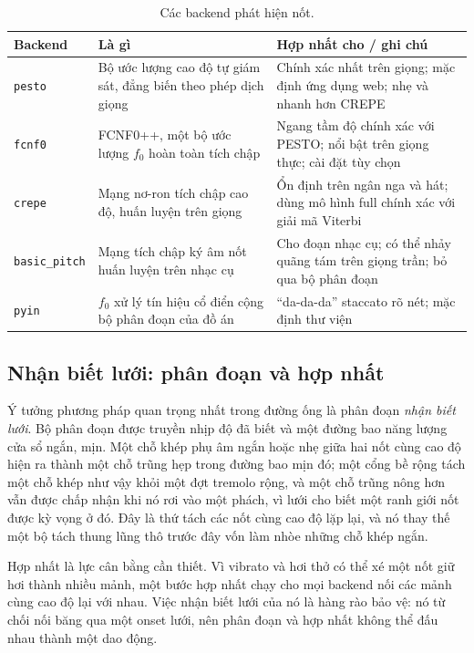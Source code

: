 \documentclass[12pt,a4paper]{article}
\begin{document}
\begin{table}[H]
\centering
\caption{Các backend phát hiện nốt.}
\label{tab:backends}
\begin{tabular}{l p{} p{}}
\toprule
\textbf{Backend} & \textbf{Là gì} & \textbf{Hợp nhất cho / ghi chú} \\
\midrule
\texttt{pesto} & Bộ ước lượng cao độ tự giám sát, đẳng biến theo phép dịch giọng &
Chính xác nhất trên giọng; mặc định ứng dụng web; nhẹ và nhanh hơn CREPE \\
\texttt{fcnf0} & FCNF0++, một bộ ước lượng $f_0$ hoàn toàn tích chập & Ngang tầm độ
chính xác với PESTO; nổi bật trên giọng thực; cài đặt tùy chọn \\
\texttt{crepe} & Mạng nơ-ron tích chập cao độ, huấn luyện trên giọng & Ổn định trên
ngân nga và hát; dùng mô hình full chính xác với giải mã Viterbi \\
\texttt{basic\_pitch} & Mạng tích chập ký âm nốt huấn luyện trên nhạc cụ & Cho đoạn
nhạc cụ; có thể nhảy quãng tám trên giọng trần; bỏ qua bộ phân đoạn \\
\texttt{pyin} & $f_0$ xử lý tín hiệu cổ điển cộng bộ phân đoạn của đồ án & ``da-da-da''
staccato rõ nét; mặc định thư viện \\
\bottomrule
\end{tabular}
\end{table}

\subsection{Nhận biết lưới: phân đoạn và hợp nhất}

Ý tưởng phương pháp quan trọng nhất trong đường ống là phân đoạn \emph{nhận biết
lưới}. Bộ phân đoạn được truyền nhịp độ đã biết và một đường bao năng lượng cửa sổ
ngắn, mịn. Một chỗ khép phụ âm ngắn hoặc nhẹ giữa hai nốt cùng cao độ hiện ra thành
một chỗ trũng hẹp trong đường bao mịn đó; một cổng bề rộng tách một chỗ khép như
vậy khỏi một đợt tremolo rộng, và một chỗ trũng nông hơn vẫn được chấp nhận khi nó
rơi vào một phách, vì lưới cho biết một ranh giới nốt được kỳ vọng ở đó. Đây là thứ
tách các nốt cùng cao độ lặp lại, và nó thay thế một bộ tách thung lũng thô trước
đây vốn làm nhòe những chỗ khép ngắn.

Hợp nhất là lực cân bằng cần thiết. Vì vibrato và hơi thở có thể xé một nốt giữ hơi
thành nhiều mảnh, một bước hợp nhất chạy cho mọi backend nối các mảnh cùng cao độ
lại với nhau. Việc nhận biết lưới của nó là hàng rào bảo vệ: nó từ chối nối băng qua
một onset lưới, nên phân đoạn và hợp nhất không thể đấu nhau thành một dao động.
\end{document}
